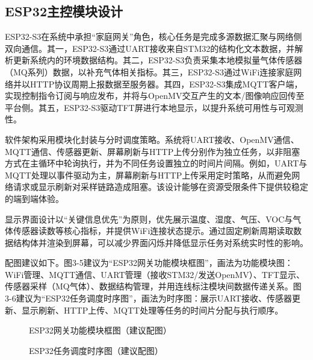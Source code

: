 \subsection{ESP32主控模块设计}
\par ESP32-S3在系统中承担“家庭网关”角色，核心任务是完成多源数据汇聚与网络侧双向通信。其一，ESP32-S3通过UART接收来自STM32的结构化文本数据，并解析更新系统内的环境数据结构。其二，ESP32-S3负责采集本地模拟量气体传感器（MQ系列）数据，以补充气体相关指标。其三，ESP32-S3通过WiFi连接家庭网络并以HTTP协议周期上报数据至服务器。其四，ESP32-S3集成MQTT客户端，实现控制指令订阅与响应发布，并将与OpenMV交互产生的文本/图像响应回传至平台侧。其五，ESP32-S3驱动TFT屏进行本地显示，以提升系统可用性与可观测性。
\par 软件架构采用模块化封装与分时调度策略。系统将UART接收、OpenMV通信、MQTT通信、传感器更新、屏幕刷新与HTTP上传分别作为独立任务，以非阻塞方式在主循环中轮询执行，并为不同任务设置独立的时间片间隔。例如，UART与MQTT处理以事件驱动为主，屏幕刷新与HTTP上传采用定时策略，从而避免网络请求或显示刷新对采样链路造成阻塞。该设计能够在资源受限条件下提供较稳定的端到端体验。
\par 显示界面设计以“关键信息优先”为原则，优先展示温度、湿度、气压、VOC与气体传感器读数等核心指标，并提供WiFi连接状态提示。通过固定刷新周期读取数据结构体并渲染到屏幕，可以减少界面闪烁并降低显示任务对系统实时性的影响。

\par 配图建议如下。图3-5建议为“ESP32网关功能模块框图”，画法为功能模块图：WiFi管理、MQTT通信、UART管理（接收STM32/发送OpenMV）、TFT显示、传感器采样（MQ气体）、数据结构管理，并用连线标注模块间数据传递关系。图3-6建议为“ESP32任务调度时序图”，画法为时序图：展示UART接收、传感器更新、显示刷新、HTTP上传、MQTT处理等任务的时间片分配与执行顺序。
\begin{figure}[H]
\centering
{}
\caption{ESP32网关功能模块框图（建议配图）}
\label{fig:esp32_modules}
\end{figure}
\begin{figure}[H]
\centering
{}
\caption{ESP32任务调度时序图（建议配图）}
\label{fig:esp32_scheduling}
\end{figure}

